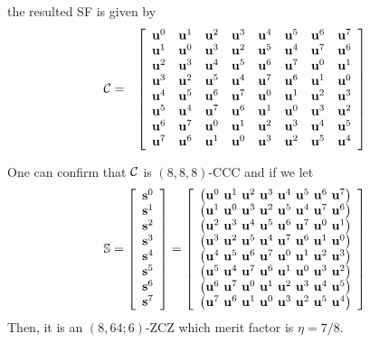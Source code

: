 \documentclass[dvipdfmx]{beamer}
\renewcommand{\maketitle}{%
  \vspace*{1ex}%
  \begin{center}%
    \Huge\inserttitle\\%
    \LARGE\insertauthor\\%
    \Large\insertinstitute%
  \end{center}%
  \vspace*{-1ex}%
}
\begin{document}
\begin{frame}{\maketitle}
\begin{columns}
\begin{column}{.45\textwidth}
\begin{example}
the resulted SF is given by
 \begin{eqnarray*}
\mathcal{C} &=&\left[
 \begin{array}{cccccccc}
{\bf u}^{0} & {\bf u}^{1} & {\bf u}^{2} & {\bf u}^{3} & {\bf u}^{4} & {\bf u}^{5} & {\bf u}^{6} & {\bf u}^{7} \cr
{\bf u}^{1} & {\bf u}^{0} & {\bf u}^{3} & {\bf u}^{2} & {\bf u}^{5} & {\bf u}^{4} & {\bf u}^{7} & {\bf u}^{6} \cr
{\bf u}^{2} & {\bf u}^{3} & {\bf u}^{4} & {\bf u}^{5} & {\bf u}^{6} & {\bf u}^{7} & {\bf u}^{0} & {\bf u}^{1} \cr
{\bf u}^{3} & {\bf u}^{2} & {\bf u}^{5} & {\bf u}^{4} & {\bf u}^{7} & {\bf u}^{6} &  {\bf u}^{1} & {\bf u}^{0} \cr
{\bf u}^{4} & {\bf u}^{5} & {\bf u}^{6} & {\bf u}^{7} & {\bf u}^{0} & {\bf u}^{1} & {\bf u}^{2} & {\bf u}^{3} \cr
{\bf u}^{5} & {\bf u}^{4} & {\bf u}^{7} & {\bf u}^{6} & {\bf u}^{1} & {\bf u}^{0} & {\bf u}^{3} & {\bf u}^{2} \cr
{\bf u}^{6} & {\bf u}^{7} & {\bf u}^{0} & {\bf u}^{1} & {\bf u}^{2} & {\bf u}^{3} & {\bf u}^{4} & {\bf u}^{5} \cr
{\bf u}^{7} & {\bf u}^{6} & {\bf u}^{1} & {\bf u}^{0} & {\bf u}^{3} & {\bf u}^{2} & {\bf u}^{5} & {\bf u}^{4}  \end{array}
\right]
\label{CCC22}
\end{eqnarray*}

One can confirm that ${\cal C}$ is $(8,8,8)$-CCC and if we let
\begin{eqnarray*}
\mathbb{S} = \left[
\begin{array}{c}
{\bf s}^{0} \cr
{\bf s}^{1} \cr
{\bf s}^{2} \cr
{\bf s}^{3} \cr
{\bf s}^{4} \cr
{\bf s}^{5} \cr
{\bf s}^{6} \cr
{\bf s}^{7}
\end{array}
\right] = 
\left[
 \begin{array}{c}
\left({\bf u}^{0} ~ {\bf u}^{1} ~ {\bf u}^{2} ~ {\bf u}^{3} ~ {\bf u}^{4} ~ {\bf u}^{5} ~ {\bf u}^{6} ~ {\bf u}^{7} \right) \cr
\left({\bf u}^{1} ~ {\bf u}^{0} ~ {\bf u}^{3} ~ {\bf u}^{2} ~ {\bf u}^{5} ~ {\bf u}^{4} ~ {\bf u}^{7} ~ {\bf u}^{6} \right)\cr
\left({\bf u}^{2} ~ {\bf u}^{3} ~ {\bf u}^{4} ~ {\bf u}^{5} ~ {\bf u}^{6} ~ {\bf u}^{7} ~ {\bf u}^{0} ~ {\bf u}^{1} \right)\cr
\left({\bf u}^{3} ~ {\bf u}^{2} ~ {\bf u}^{5} ~ {\bf u}^{4} ~ {\bf u}^{7} ~ {\bf u}^{6} ~  {\bf u}^{1} ~ {\bf u}^{0} \right)\cr
\left({\bf u}^{4} ~ {\bf u}^{5} ~ {\bf u}^{6} ~ {\bf u}^{7} ~ {\bf u}^{0} ~ {\bf u}^{1} ~ {\bf u}^{2} ~ {\bf u}^{3} \right)\cr
\left({\bf u}^{5} ~ {\bf u}^{4} ~ {\bf u}^{7} ~ {\bf u}^{6} ~ {\bf u}^{1} ~ {\bf u}^{0} ~ {\bf u}^{3} ~ {\bf u}^{2} \right)\cr
\left({\bf u}^{6} ~ {\bf u}^{7} ~ {\bf u}^{0} ~ {\bf u}^{1} ~ {\bf u}^{2} ~ {\bf u}^{3} ~ {\bf u}^{4} ~ {\bf u}^{5} \right)\cr
\left({\bf u}^{7} ~ {\bf u}^{6} ~ {\bf u}^{1} ~ {\bf u}^{0} ~ {\bf u}^{3} ~ {\bf u}^{2} ~ {\bf u}^{5} ~ {\bf u}^{4}  \right)
\end{array}
\right]
\end{eqnarray*}
Then, it is an $(8,64; 6)$-ZCZ which merit factor is $\eta = 7/8$.
    \end{example}
      

\end{column}
\end{columns}
\end{frame}
\end{document}

